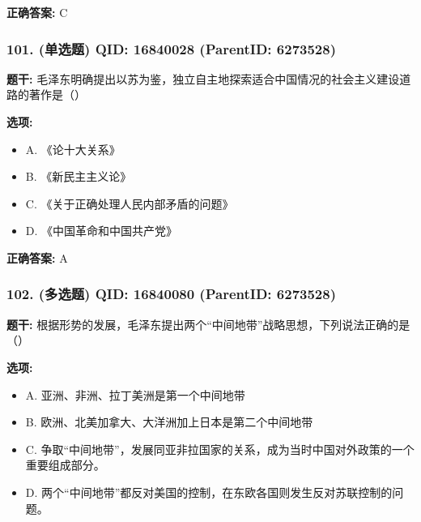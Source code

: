 \documentclass[12pt,UTF8]{ctexart}
\begin{document}
\textbf{正确答案:}
C

\vspace{0.3em}\hrulefill\vspace{0.7em}

\subsubsection*{101. (单选题) \small QID: 16840028 (ParentID: 6273528)}

\textbf{题干:}
毛泽东明确提出以苏为鉴，独立自主地探索适合中国情况的社会主义建设道路的著作是（）



\textbf{选项:}
\begin{itemize}[leftmargin=*]

  \item A. 《论十大关系》

  \item B. 《新民主主义论》

  \item C. 《关于正确处理人民内部矛盾的问题》

  \item D. 《中国革命和中国共产党》

\end{itemize}

\textbf{正确答案:}
A

\vspace{0.3em}\hrulefill\vspace{0.7em}

\subsubsection*{102. (多选题) \small QID: 16840080 (ParentID: 6273528)}

\textbf{题干:}
根据形势的发展，毛泽东提出两个“中间地带”战略思想，下列说法正确的是（）



\textbf{选项:}
\begin{itemize}[leftmargin=*]

  \item A. 亚洲、非洲、拉丁美洲是第一个中间地带

  \item B. 欧洲、北美加拿大、大洋洲加上日本是第二个中间地带

  \item C. 争取“中间地带”，发展同亚非拉国家的关系，成为当时中国对外政策的一个重要组成部分。

  \item D. 两个“中间地带”都反对美国的控制，在东欧各国则发生反对苏联控制的问题。

\end{itemize}
\end{document}
